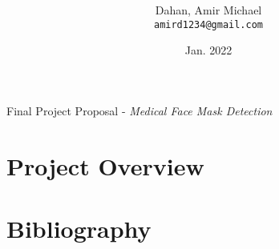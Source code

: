 

\title{ }

\author{
  Dahan, Amir Michael\\
  \texttt{amird1234@gmail.com}
}
\date{Jan. 2022}



\maketitle

Final Project Proposal - \emph{Medical Face Mask Detection}
    \clearpage

    \section{Project Overview}\label{sec:description}
    

    \section{Bibliography}\label{sec:bibliography}
    


